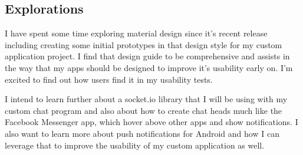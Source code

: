 \documentclass[11pt,english,numbers=endperiod,parskip=half]{scrartcl}
\begin{document}
  \subsection{Explorations}
    I have spent some time exploring material design since it's recent release
    including creating some initial prototypes in that design style for my
    custom application project. I find that design guide to be comprehensive
    and assists in the way that my apps should be designed to improve it's
    usability early on. I'm excited to find out how users find it in my
    usability tests.

    I intend to learn further about a socket.io library that I will be using
    with my custom chat program and also about how to create chat heads
    much like the Facebook Messenger app, which hover above other apps and show
    notifications. I also want to learn more about push notifications for
    Android and how I can leverage that to improve the usability of my custom
    application as well.
\end{document}
